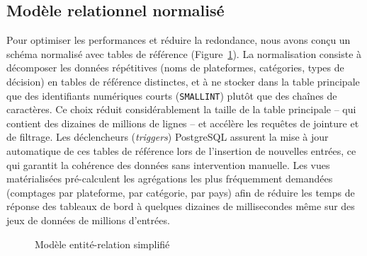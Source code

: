 \documentclass[10pt,twocolumn,a4paper]{article}
\begin{document}
\subsection{Modèle relationnel normalisé}

Pour optimiser les performances et réduire la redondance, nous avons conçu un schéma normalisé avec tables de référence (Figure~\ref{fig:schema}). La normalisation consiste à décomposer les données répétitives (noms de plateformes, catégories, types de décision) en tables de référence distinctes, et à ne stocker dans la table principale que des identifiants numériques courts (\texttt{SMALLINT}) plutôt que des chaînes de caractères. Ce choix réduit considérablement la taille de la table principale -- qui contient des dizaines de millions de lignes -- et accélère les requêtes de jointure et de filtrage. Les déclencheurs (\textit{triggers}) PostgreSQL assurent la mise à jour automatique de ces tables de référence lors de l'insertion de nouvelles entrées, ce qui garantit la cohérence des données sans intervention manuelle. Les vues matérialisées pré-calculent les agrégations les plus fréquemment demandées (comptages par plateforme, par catégorie, par pays) afin de réduire les temps de réponse des tableaux de bord à quelques dizaines de millisecondes même sur des jeux de données de millions d'entrées.

\begin{figure}[H]
\centering
{}
\caption{Modèle entité-relation simplifié}
\label{fig:schema}
\end{figure}
\end{document}
